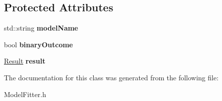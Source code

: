 \subsection*{Protected Attributes}
\begin{DoxyCompactItemize}
\item 
\hypertarget{classModelFitter_acf837c9a65e7c0626a3f0f1b4d3c2dac}{std\-::string {\bfseries model\-Name}}\label{classModelFitter_acf837c9a65e7c0626a3f0f1b4d3c2dac}

\item 
\hypertarget{classModelFitter_a82e7d062d0e12c7fdf31263361c39e47}{bool {\bfseries binary\-Outcome}}\label{classModelFitter_a82e7d062d0e12c7fdf31263361c39e47}

\item 
\hypertarget{classModelFitter_a0189c3de8ff8cf73d885fc2af170a754}{\hyperlink{classResult}{Result} {\bfseries result}}\label{classModelFitter_a0189c3de8ff8cf73d885fc2af170a754}

\end{DoxyCompactItemize}


The documentation for this class was generated from the following file\-:\begin{DoxyCompactItemize}
\item 
Model\-Fitter.\-h\end{DoxyCompactItemize}
